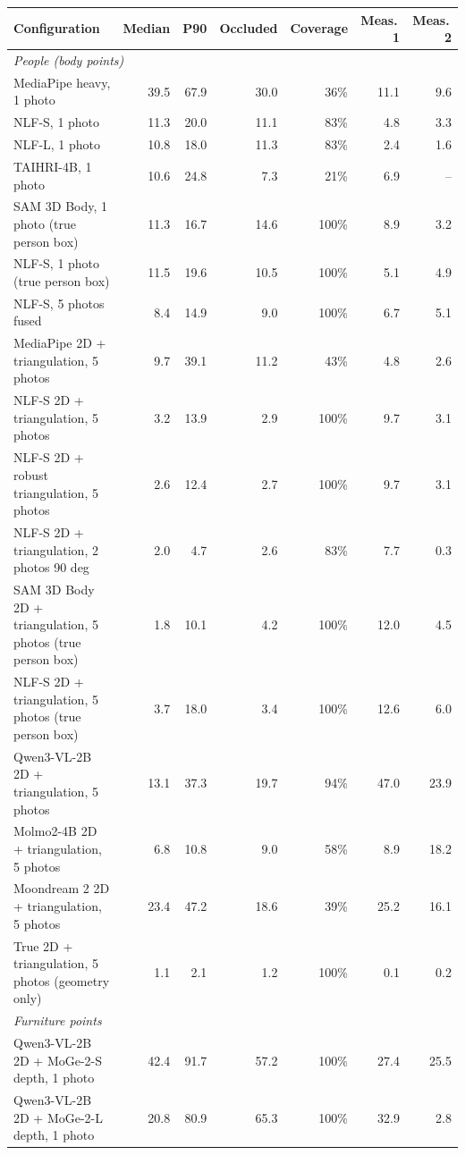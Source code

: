 {\scriptsize{}
\begin{tabular}{@{}p{6.3cm}rrrrrr@{}}
\toprule
Configuration & Median & P90 & Occluded & Coverage & Meas.\,1 & Meas.\,2 \\
\midrule
\multicolumn{7}{l}{\emph{People (body points)}}\\
MediaPipe heavy, 1 photo & 39.5 & 67.9 & 30.0 & 36\% & 11.1 & 9.6 \\
NLF-S, 1 photo & 11.3 & 20.0 & 11.1 & 83\% & 4.8 & 3.3 \\
NLF-L, 1 photo & 10.8 & 18.0 & 11.3 & 83\% & 2.4 & 1.6 \\
TAIHRI-4B, 1 photo & 10.6 & 24.8 & 7.3 & 21\% & 6.9 & -- \\
SAM 3D Body, 1 photo (true person box) & 11.3 & 16.7 & 14.6 & 100\% & 8.9 & 3.2 \\
NLF-S, 1 photo (true person box) & 11.5 & 19.6 & 10.5 & 100\% & 5.1 & 4.9 \\
NLF-S, 5 photos fused & 8.4 & 14.9 & 9.0 & 100\% & 6.7 & 5.1 \\
MediaPipe 2D + triangulation, 5 photos & 9.7 & 39.1 & 11.2 & 43\% & 4.8 & 2.6 \\
NLF-S 2D + triangulation, 5 photos & 3.2 & 13.9 & 2.9 & 100\% & 9.7 & 3.1 \\
NLF-S 2D + robust triangulation, 5 photos & 2.6 & 12.4 & 2.7 & 100\% & 9.7 & 3.1 \\
NLF-S 2D + triangulation, 2 photos 90 deg & 2.0 & 4.7 & 2.6 & 83\% & 7.7 & 0.3 \\
SAM 3D Body 2D + triangulation, 5 photos (true person box) & 1.8 & 10.1 & 4.2 & 100\% & 12.0 & 4.5 \\
NLF-S 2D + triangulation, 5 photos (true person box) & 3.7 & 18.0 & 3.4 & 100\% & 12.6 & 6.0 \\
Qwen3-VL-2B 2D + triangulation, 5 photos & 13.1 & 37.3 & 19.7 & 94\% & 47.0 & 23.9 \\
Molmo2-4B 2D + triangulation, 5 photos & 6.8 & 10.8 & 9.0 & 58\% & 8.9 & 18.2 \\
Moondream 2 2D + triangulation, 5 photos & 23.4 & 47.2 & 18.6 & 39\% & 25.2 & 16.1 \\
True 2D + triangulation, 5 photos (geometry only) & 1.1 & 2.1 & 1.2 & 100\% & 0.1 & 0.2 \\
\multicolumn{7}{l}{\emph{Furniture points}}\\
Qwen3-VL-2B 2D + MoGe-2-S depth, 1 photo & 42.4 & 91.7 & 57.2 & 100\% & 27.4 & 25.5 \\
Qwen3-VL-2B 2D + MoGe-2-L depth, 1 photo & 20.8 & 80.9 & 65.3 & 100\% & 32.9 & 2.8 \\

\end{tabular}}
